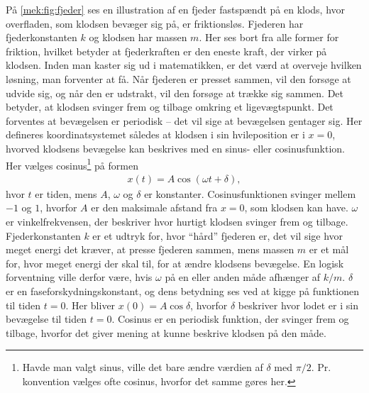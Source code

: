 \begin{example} \label{mek:ex:ho}%
På \cref{mek:fig:fjeder} ses en illustration af en fjeder fastspændt på en klods, hvor overfladen, som klodsen bevæger sig på, er friktionsløs. Fjederen har fjederkonstanten $k$ og klodsen har massen $m$. Her ses bort fra alle former for friktion, hvilket betyder at fjederkraften er den eneste kraft, der virker på klodsen. Inden man kaster sig ud i matematikken, er det værd at overveje hvilken løsning, man forventer at få. Når fjederen er presset sammen, vil den forsøge at udvide sig, og når den er udstrakt, vil den forsøge at trække sig sammen. Det betyder, at klodsen svinger frem og tilbage omkring et ligevægtspunkt. Det forventes at bevægelsen er periodisk -- det vil sige at bevægelsen gentager sig. Her defineres koordinatsystemet således at klodsen i sin hvileposition er i $x = 0$, hvorved klodsens bevægelse kan beskrives med en sinus- eller cosinusfunktion. Her vælges cosinus\footnote{Havde man valgt sinus, ville det bare ændre værdien af $\delta$ med $\pi/2$. Pr. konvention vælges ofte cosinus, hvorfor det samme gøres her.} på formen
%
\begin{align} \label{mek:eq:FjederSted}
	x(t) = A\cos(\omega t + \delta),
\end{align}
%
hvor $t$ er tiden, mens $A$, $\omega$ og $\delta$ er konstanter. Cosinusfunktionen svinger mellem $-1$ og $1$, hvorfor $A$ er den maksimale afstand fra $x=0$, som klodsen kan have. $\omega$ er vinkelfrekvensen, der beskriver hvor hurtigt klodsen svinger frem og tilbage.
Fjederkonstanten $k$ er et udtryk for, hvor ``hård'' fjederen er, det vil sige hvor meget energi det kræver, at presse fjederen sammen, mens massen $m$ er et mål for, hvor meget energi der skal til, for at ændre klodsens bevægelse. En logisk forventning ville derfor være, hvis $\omega$ på en eller anden måde afhænger af $k/m$. $\delta$ er en faseforskydningskonstant, og dens betydning ses ved at kigge på funktionen til tiden $t=0$. Her bliver $x(0) = A\cos\delta$, hvorfor $\delta$ beskriver hvor lodet er i sin bevægelse til tiden $t=0$. Cosinus er en periodisk funktion, der svinger frem og tilbage, hvorfor det giver mening at kunne beskrive klodsen på den måde.


\end{example}
